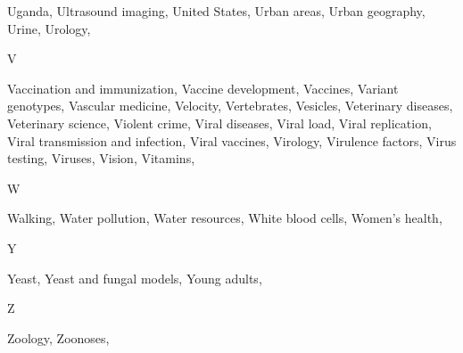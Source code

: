 Uganda, Ultrasound imaging, United States, Urban areas, Urban geography, Urine, Urology, 

V

Vaccination and immunization, Vaccine development, Vaccines, Variant genotypes, Vascular medicine, Velocity, Vertebrates, Vesicles, Veterinary diseases, Veterinary science, Violent crime, Viral diseases, Viral load, Viral replication, Viral transmission and infection, Viral vaccines, Virology, Virulence factors, Virus testing, Viruses, Vision, Vitamins, 

W

Walking, Water pollution, Water resources, White blood cells, Women's health, 

Y

Yeast, Yeast and fungal models, Young adults, 

Z

Zoology, Zoonoses, 